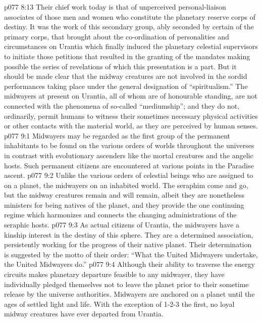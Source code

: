 \vs p077 8:13 Their chief work today is that of unperceived personal\hyp{}liaison associates of those men and women who constitute the planetary reserve corps of destiny. It was the work of this secondary group, ably seconded by certain of the primary corps, that brought about the co\hyp{}ordination of personalities and circumstances on Urantia which finally induced the planetary celestial supervisors to initiate those petitions that resulted in the granting of the mandates making possible the series of revelations of which this presentation is a part. But it should be made clear that the midway creatures are not involved in the sordid performances taking place under the general designation of “spiritualism.” The midwayers at present on Urantia, all of whom are of honourable standing, are not connected with the phenomena of so\hyp{}called “mediumship”; and they do not, ordinarily, permit humans to witness their sometimes necessary physical activities or other contacts with the material world, as they are perceived by human senses.
\vs p077 9:1 Midwayers may be regarded as the first group of the permanent inhabitants to be found on the various orders of worlds throughout the universes in contrast with evolutionary ascenders like the mortal creatures and the angelic hosts. Such permanent citizens are encountered at various points in the Paradise ascent.
\vs p077 9:2 Unlike the various orders of celestial beings who are assigned to  on a planet, the midwayers  on an inhabited world. The seraphim come and go, but the midway creatures remain and will remain, albeit they are nonetheless ministers for being natives of the planet, and they provide the one continuing regime which harmonizes and connects the changing administrations of the seraphic hosts.
\vs p077 9:3 As actual citizens of Urantia, the midwayers have a kinship interest in the destiny of this sphere. They are a determined association, persistently working for the progress of their native planet. Their determination is suggested by the motto of their order: “What the United Midwayers undertake, the United Midwayers do.”
\vs p077 9:4 Although their ability to traverse the energy circuits makes planetary departure feasible to any midwayer, they have individually pledged themselves not to leave the planet prior to their sometime release by the universe authorities. Midwayers are anchored on a planet until the ages of settled light and life. With the exception of 1\hyp{}2\hyp{}3 the first, no loyal midway creatures have ever departed from Urantia.
